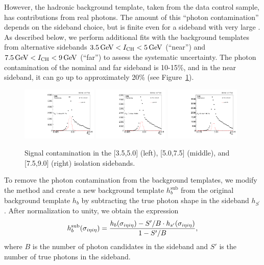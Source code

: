 However, the hadronic background template, taken from the data control sample, has contributions from real photons. 
The amount of this ``photon contamination'' depends on the sideband choice, but is finite even for a sideband with very large \ICH. 
As described below, we perform additional fits with the background templates from alternative sidebands $3.5\,\text{Ge\hspace{-.08em}V} < I_{\text{CH}} < 5\,\text{Ge\hspace{-.08em}V}$ (``near'') and $7.5\,\text{Ge\hspace{-.08em}V} < I_{\text{CH}} < 9\,\text{Ge\hspace{-.08em}V}$ (``far'') to assess the systematic uncertainty. 
The photon contamination of the nominal and far sideband is 10-15\%, and in the near sideband, it can go up to approximately 20\% (see Figure~\ref{fig:impurity-signal-contamination}).

\begin{figure}[htbp]
  \centering
  \includegraphics[width=0.32\textwidth]{Calibration/Figures/pvsf/sbcontam_near.pdf}
  \includegraphics[width=0.32\textwidth]{Calibration/Figures/pvsf/sbcontam_nominal.pdf}
  \includegraphics[width=0.32\textwidth]{Calibration/Figures/pvsf/sbcontam_far.pdf}
  \caption{
    Signal contamination in the [3.5,5.0] (left), [5.0,7.5] (middle), and [7.5,9.0] (right) isolation sidebands.
  }
  \label{fig:impurity-signal-contamination}
\end{figure}

To remove the photon contamination from the background templates, we modify the method and create a new background template $h_{b}^{\text{sub}}$ from the original background template $h_{b}$ by subtracting the true photon shape in the sideband $h_{S^{'}}$. 
After normalization to unity, we obtain the expression
\begin{align}
  h_{b}^{\text{sub}}(\sigma_{i\eta i\eta}) = \frac{h_{b}(\sigma_{i\eta i\eta}) - S'/B \cdot h_{s'}(\sigma_{i\eta i\eta})}{1 - S'/B},
\end{align}
where $B$ is the number of photon candidates in the sideband and $S'$ is the number of true photons in the sideband.

